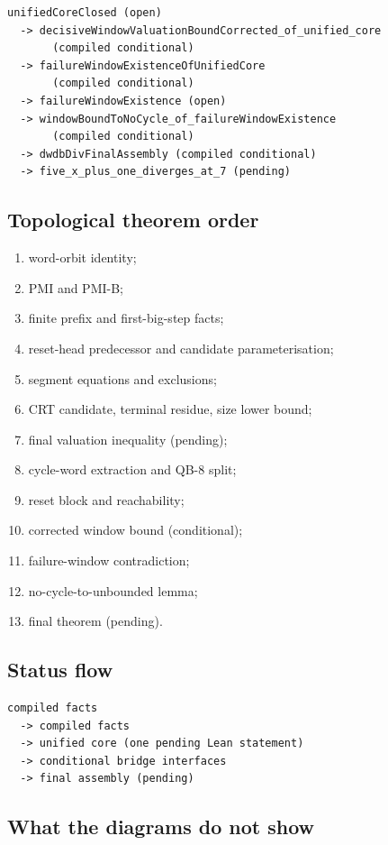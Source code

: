 \begin{verbatim}
unifiedCoreClosed (open)
  -> decisiveWindowValuationBoundCorrected_of_unified_core
       (compiled conditional)
  -> failureWindowExistenceOfUnifiedCore
       (compiled conditional)
  -> failureWindowExistence (open)
  -> windowBoundToNoCycle_of_failureWindowExistence
       (compiled conditional)
  -> dwdbDivFinalAssembly (compiled conditional)
  -> five_x_plus_one_diverges_at_7 (pending)
\end{verbatim}

\subsection{Topological theorem order}

\begin{enumerate}[leftmargin=*]
\item word-orbit identity;
\item PMI and PMI-B;
\item finite prefix and first-big-step facts;
\item reset-head predecessor and candidate parameterisation;
\item segment equations and exclusions;
\item CRT candidate, terminal residue, size lower bound;
\item final valuation inequality (pending);
\item cycle-word extraction and QB-8 split;
\item reset block and reachability;
\item corrected window bound (conditional);
\item failure-window contradiction;
\item no-cycle-to-unbounded lemma;
\item final theorem (pending).
\end{enumerate}

\subsection{Status flow}

\begin{verbatim}
compiled facts
  -> compiled facts
  -> unified core (one pending Lean statement)
  -> conditional bridge interfaces
  -> final assembly (pending)
\end{verbatim}

\subsection{What the diagrams do not show}


